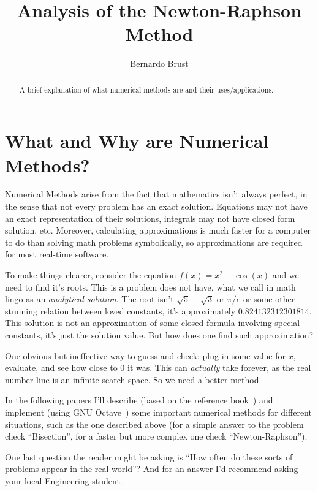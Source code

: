 \documentclass[12pt]{article}
\title{Analysis of the Newton-Raphson Method}
\author{Bernardo Brust}
\theoremstyle{remark}
\begin{document}
\maketitle

\begin{abstract}
  A brief explanation of what numerical methods are and their uses/applications.
\end{abstract}

\section{What and Why are Numerical Methods?}\label{sec:intro}

Numerical Methods arise from the fact that mathematics isn't always perfect, in the sense that not every problem has an exact solution. Equations may not have an exact representation of their solutions, integrals may not have closed form solution, etc. Moreover, calculating approximations is much faster for a computer to do than solving math problems symbolically, so approximations are required for most real-time software.

To make things clearer, consider the equation $f(x) = x^2 - \cos(x)$ and we need to find it's roots. This is a problem does not have, what we call in math lingo as an \emph{analytical solution}. The root isn't $\sqrt{5} - \sqrt{3}$ or $\pi/e$ or some other stunning relation between loved constants, it's approximately $0.824132312301814$. This solution is not an approximation of some closed formula involving special constants, it's just the solution value. But how does one find such approximation?

One obvious but ineffective way to guess and check: plug in some value for $x$, evaluate, and see how close to $0$ it was. This can \emph{actually} take forever, as the real number line is an infinite search space. So we need a better method.

In the following papers I'll describe (based on the reference book~\cite{book}) and implement (using GNU Octave~\cite{octave}) some important numerical methods for different situations, such as the one described above (for a simple answer to the problem check ``Bisection'', for a faster but more complex one check ``Newton-Raphson'').

One last question the reader might be asking is ``How often do these sorts of problems appear in the real world''? And for an answer I'd recommend asking your local Engineering student.
\end{document}
